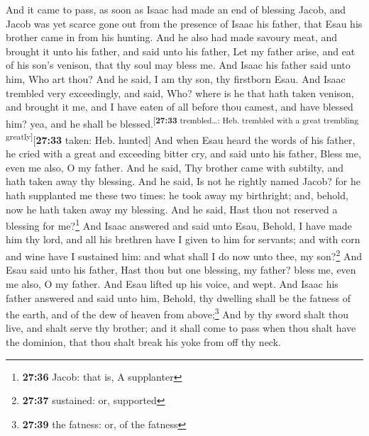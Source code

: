  And it came to pass, as soon as Isaac had made an end of
blessing Jacob, and Jacob was yet scarce gone out from the presence of
Isaac his father, that Esau his brother came in from his hunting.
 And he also had made savoury meat, and brought it unto
his father, and said unto his father, Let my father arise, and eat of
his son's venison, that thy soul may bless me.  And Isaac
his father said unto him, Who art thou? And he said, I am thy son, thy
firstborn Esau.  And Isaac trembled very exceedingly, and
said, Who? where is he that hath taken venison, and brought it me, and I
have eaten of all before thou camest, and have blessed him? yea, and he
shall be blessed.\textsuperscript{{[}\textbf{27:33} trembled\ldots: Heb.
trembled with a great trembling greatly{]}}{[}\textbf{27:33} taken: Heb.
hunted{]}  And when Esau heard the words of his father,
he cried with a great and exceeding bitter cry, and said unto his
father, Bless me, even me also, O my father.  And he
said, Thy brother came with subtilty, and hath taken away thy blessing.
 And he said, Is not he rightly named Jacob? for he hath
supplanted me these two times: he took away my birthright; and, behold,
now he hath taken away my blessing. And he said, Hast thou not reserved
a blessing for me?\footnote{\textbf{27:36} Jacob: that is, A supplanter}
 And Isaac answered and said unto Esau, Behold, I have
made him thy lord, and all his brethren have I given to him for
servants; and with corn and wine have I sustained him: and what shall I
do now unto thee, my son?\footnote{\textbf{27:37} sustained: or,
  supported}  And Esau said unto his father, Hast thou
but one blessing, my father? bless me, even me also, O my father. And
Esau lifted up his voice, and wept.  And Isaac his father
answered and said unto him, Behold, thy dwelling shall be the fatness of
the earth, and of the dew of heaven from above;\footnote{\textbf{27:39}
  the fatness: or, of the fatness}  And by thy sword
shalt thou live, and shalt serve thy brother; and it shall come to pass
when thou shalt have the dominion, that thou shalt break his yoke from
off thy neck.

